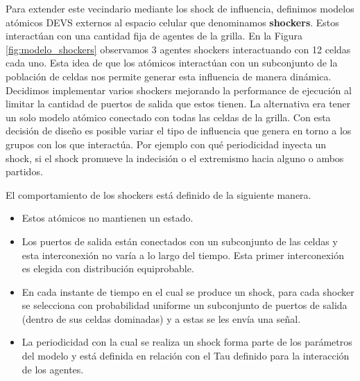 Para extender este vecindario mediante los shock de influencia, definimos modelos atómicos DEVS\cite{DEVS} externos al espacio celular que denominamos \textbf{shockers}. Estos interactúan con una cantidad fija de agentes de la grilla. En la Figura \ref{fig:modelo_shockers} observamos 3 agentes shockers interactuando con 12 celdas cada uno. Esta idea de que los atómicos interactúan con un subconjunto de la población de celdas nos permite generar esta influencia de manera dinámica. Decidimos implementar varios shockers mejorando la performance de ejecución al limitar la cantidad de puertos de salida que estos tienen. La alternativa era tener un solo modelo atómico conectado con todas las celdas de la grilla.  Con esta decisión de diseño es posible variar el tipo de influencia que genera en torno a los grupos con los que interactúa. Por ejemplo con qué periodicidad inyecta un shock, si el shock promueve la indecisión o el extremismo hacia alguno o ambos partidos.

El comportamiento de los shockers está definido de la siguiente manera.

\begin{itemize}
\item Estos atómicos no mantienen un estado.
\item Los puertos de salida están conectados con un subconjunto de las celdas y esta interconexión no varía a lo largo del tiempo. Esta primer interconexión es elegida con distribución equiprobable.
\item En cada instante de tiempo en el cual se produce un shock, para cada shocker se selecciona con probabilidad uniforme un subconjunto de puertos de salida (dentro de sus celdas dominadas) y a estas se les envía una señal.
\item La periodicidad con la cual se realiza un shock forma parte de los parámetros del modelo y está definida en relación con el Tau definido para la interacción de los agentes.
\end{itemize}

